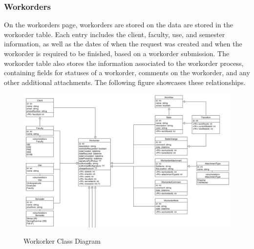 {{{{{{{{\subsubsection{Workorders}
On the workorders page, workorders are stored on the data are stored in the workorder table. Each entry includes the client, faculty, use, and semester information, as well as the dates of when the request was created and when the workorder is required to be finished, based on a workorder submission. The workorder table also stores the information associated to the workorder process, containing fields for statuses of a workorder, comments on the workorder, and any other additional attachments. The following figure showcases these relationships. 
\begin{figure}[H]
	\centering
	\includegraphics[width=5in]{workorder.png}\\
	\caption{Workorker Class Diagram}
	\label{fig:tobias}
\end{figure}
}}}}}}}}
